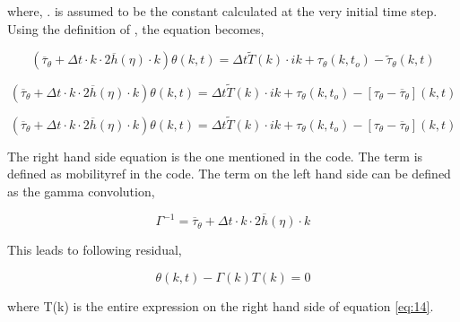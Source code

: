 \documentclass[a4paper,11pt,dvipsnames]{article}
\begin{document}
where, . 
 is assumed to be the constant  calculated at the very initial time step. 
Using the definition of \mathsym{\tau_\theta = \overline{\tau}_\theta + \tilde{\tau}_\theta}, the equation becomes, 

\begin{equation}
\left ( \overline{\tau}_\theta + \Delta t \cdot k \cdot 2 \overline{h} (\eta) \cdot k \right ) \theta (k,t) = 
\Delta t \tilde{T}(k) \cdot ik + \tau_\theta (k,t_o) - \tilde{\tau}_\theta (k,t) \label{eq:15}
\end{equation}

\begin{equation}
\left ( \overline{\tau}_\theta + \Delta t \cdot k \cdot 2 \overline{h} (\eta) \cdot k \right ) \theta (k,t) = 
\Delta t \tilde{T}(k) \cdot ik + \tau_\theta (k,t_o) - \left [ \tau_\theta - \overline{\tau}_\theta \right ] (k,t) \label{eq:16}
\end{equation}

\begin{equation}
\left ( \overline{\tau}_\theta + \Delta t \cdot k \cdot 2 \overline{h} (\eta) \cdot k \right ) \theta (k,t) = 
\Delta t \tilde{T}(k) \cdot ik + \tau_\theta (k,t_o) - \left [ \tau_\theta - \overline{\tau}_\theta \right ] (k,t) \label{eq:17}
\end{equation}

The right hand side equation is the one mentioned in the code. 
The term  is defined as mobility\textunderscore ref in the code. 
The term on the left hand side can be defined as the gamma convolution, 

\begin{equation}
    \Gamma^{-1} = \overline{\tau}_\theta + \Delta t \cdot k \cdot 2 \overline{h} (\eta) \cdot k \label{eq:18}
\end{equation}

This leads to following residual, 

\begin{equation}
    \theta (k,t) - \Gamma (k) T(k) = 0 \label{eq:19}
\end{equation}

where T(k) is the entire expression on the right hand side of equation \ref{eq:14}. 



\end{document}
